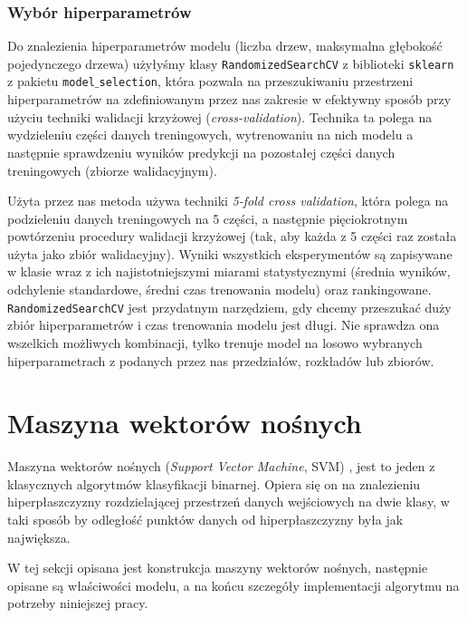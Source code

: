 \subsubsection {Wybór hiperparametrów}
\label{subsub: hyperparameters}

Do znalezienia hiperparametrów modelu (liczba drzew, maksymalna głębokość pojedynczego drzewa) użyłyśmy klasy \verb_RandomizedSearchCV_ z biblioteki
\verb_sklearn_ z pakietu \verb_model_$\_$\verb_selection_, która pozwala na przeszukiwaniu przestrzeni hiperparametrów na zdefiniowanym przez nas zakresie w efektywny sposób przy użyciu techniki walidacji krzyżowej (\textit{cross-validation}). Technika ta polega na wydzieleniu części danych treningowych, wytrenowaniu na nich modelu a następnie sprawdzeniu wyników predykcji na pozostałej części danych treningowych (zbiorze walidacyjnym). 

Użyta przez nas metoda używa techniki \textit{5-fold cross validation}, która polega na podzieleniu danych treningowych na 5 części, a następnie pięciokrotnym powtórzeniu procedury walidacji krzyżowej (tak, aby każda z 5 części raz została użyta jako zbiór walidacyjny). Wyniki wszystkich eksperymentów są zapisywane w klasie wraz z ich najistotniejszymi miarami statystycznymi (średnia wyników, odchylenie standardowe, średni czas trenowania modelu) oraz rankingowane.
\\\verb_RandomizedSearchCV_ jest przydatnym narzędziem, gdy chcemy przeszukać duży zbiór hiperparametrów i czas trenowania modelu jest długi. Nie sprawdza ona wszelkich możliwych kombinacji, tylko trenuje model na losowo wybranych hiperparametrach z podanych przez nas przedziałów, rozkładów lub zbiorów. 


\section{Maszyna wektorów nośnych}
\label{sec:svm}

Maszyna wektorów nośnych (\textit{Support Vector Machine}, SVM) \cite{cortes1995support}, jest to jeden z klasycznych algorytmów klasyfikacji binarnej. Opiera się on na znalezieniu hiperpłaszczyzny rozdzielającej przestrzeń danych wejściowych na dwie klasy, w taki sposób by odległość punktów danych od hiperpłaszczyzny była jak największa.

W tej sekcji opisana jest konstrukcja maszyny wektorów nośnych, następnie opisane są właściwości modelu, a na końcu szczegóły implementacji algorytmu na potrzeby niniejszej pracy.


